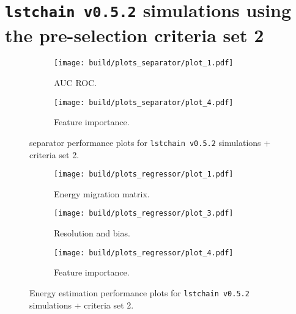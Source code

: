 \section{\texttt{lstchain v0.5.2} simulations using the pre-selection criteria set 2}
\begin{figure}
    \centering
    \begin{subfigure}{0.6\textwidth}
        \centering
        \texttt{[image: build/plots\_separator/plot\_1.pdf]}
        \caption{AUC ROC.}
        \label{fig:separator_newMC_150}
    \end{subfigure}
    \vfill
    \begin{subfigure}{0.6\textwidth}
        \centering
        \texttt{[image: build/plots\_separator/plot\_4.pdf]}
        \caption{Feature importance.}
        \label{fig:separator_newMC_150_feature}
    \end{subfigure}
    \caption{separator performance plots for \texttt{lstchain v0.5.2} simulations + criteria set 2.}
\end{figure}

\begin{figure}
    \centering
    \begin{subfigure}{0.49\textwidth}
        \centering
        \texttt{[image: build/plots\_regressor/plot\_1.pdf]}
        \caption{Energy migration matrix.}
    \end{subfigure}
    \hfill
    \begin{subfigure}{0.49\textwidth}
        \centering
        \texttt{[image: build/plots\_regressor/plot\_3.pdf]}
        \caption{Resolution and bias.}
        \label{fig:regressor_newMC_150_bias}
    \end{subfigure}
    \newline\vfill
    \begin{subfigure}{0.49\textwidth}
        \centering
        \texttt{[image: build/plots\_regressor/plot\_4.pdf]}
        \caption{Feature importance.}
    \end{subfigure}
    \caption{Energy estimation performance plots for \texttt{lstchain v0.5.2} simulations + criteria set 2.}
    \label{fig:regressor_newMC_150}
\end{figure}

